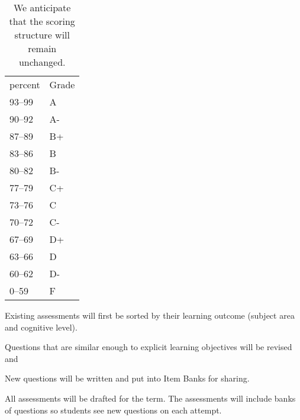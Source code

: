 \documentclass[10pt,letterpaper]{article}
\begin{document}
\begin{wraptable}{R}{0pt}
\begin{tabular}{ll}
percent&Grade\\
93--99&A\\
90--92&A-\\
87--89&B+\\
83--86&B\\
80--82&B-\\
77--79&C+\\
73--76&C\\
70--72&C-\\
67--69&D+\\
63--66&D\\
60--62&D-\\
0--59&F
\end{tabular}
\caption{\label{tbl:points}
We anticipate that the scoring structure will remain unchanged.} 
\end{wraptable}



%
%

 Existing assessments will first be sorted by their learning outcome (subject area and cognitive level). 

 Questions that are similar enough to explicit learning objectives will be revised and 

 New questions will be written and put into Item Banks for sharing.

All assessments will be drafted for the term. The assessments will include banks of questions so students see new questions on each attempt. 

\end{document}
